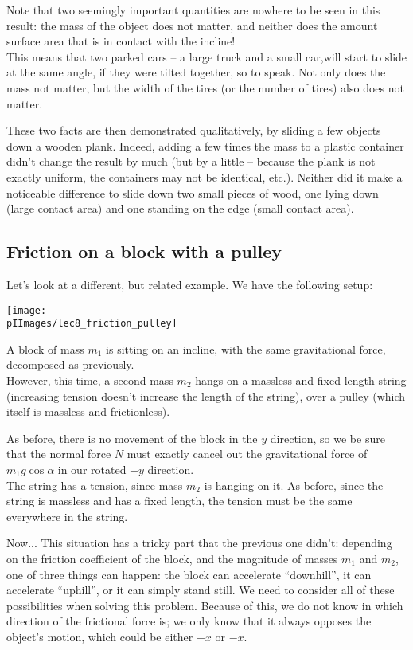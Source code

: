 Note that two seemingly important quantities are nowhere to be seen in this result: the mass of the object does not matter, and neither does the amount surface area that is in contact with the incline!\\
This means that two parked cars -- a large truck and a small car,will start to slide at the same angle, if they were tilted together, so to speak. Not only does the mass not matter, but the width of the tires (or the number of tires) also does not matter.

These two facts are then demonstrated qualitatively, by sliding a few objects down a wooden plank. Indeed, adding a few times the mass to a plastic container didn't change the result by much (but by a little -- because the plank is not exactly uniform, the containers may not be identical, etc.). Neither did it make a noticeable difference to slide down two small pieces of wood, one lying down (large contact area) and one standing on the edge (small contact area).

\subsection{Friction on a block with a pulley}

Let's look at a different, but related example. We have the following setup:

\begin{center}
\texttt{[image: \\pIImages/lec8\_friction\_pulley]}
\end{center}

A block of mass $m_1$ is sitting on an incline, with the same gravitational force, decomposed as previously.\\
However, this time, a second mass $m_2$ hangs on a massless and fixed-length string (increasing tension doesn't increase the length of the string), over a pulley (which itself is massless and frictionless).

As before, there is no movement of the  block in the $y$ direction, so we be sure that the normal force $N$ must exactly cancel out the gravitational force of $m_1 g \cos \alpha$ in our rotated $-y$ direction.\\
The string has a tension, since mass $m_2$ is hanging on it. As before, since the string is massless and has a fixed length, the tension must be the same everywhere in the string.

Now... This situation has a tricky part that the previous one didn't: depending on the friction coefficient of the block, and the magnitude of masses $m_1$ and $m_2$, one of three things can happen: the block can accelerate ``downhill'', it can accelerate ``uphill'', or it can simply stand still. We need to consider all of these possibilities when solving this problem. Because of this, we do not know in which direction of the frictional force is; we only know that it always opposes the object's motion, which could be either $+x$ or $-x$.

